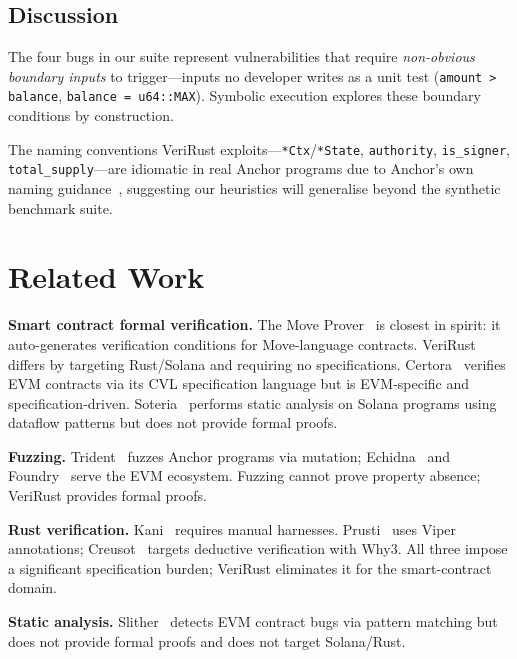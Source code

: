 \documentclass[sigconf,review,anonymous]{acmart}
\begin{document}
\subsection{Discussion}

The four bugs in our suite represent vulnerabilities that require
\emph{non-obvious boundary inputs} to trigger---inputs no developer
writes as a unit test (\texttt{amount > balance},
\texttt{balance = u64::MAX}).
Symbolic execution explores these boundary conditions by construction.

The naming conventions VeriRust exploits---\texttt{*Ctx}/\texttt{*State},
\texttt{authority}, \texttt{is\_signer}, \texttt{total\_supply}---are
idiomatic in real Anchor programs due to Anchor's own naming
guidance~\cite{anchor}, suggesting our heuristics will generalise
beyond the synthetic benchmark suite.

\section{Related Work}
\label{sec:related}

\noindent\textbf{Smart contract formal verification.}
The Move Prover~\cite{moveprover2022} is closest in spirit: it
auto-generates verification conditions for Move-language contracts.
VeriRust differs by targeting Rust/Solana and requiring no
specifications.
Certora~\cite{certora} verifies EVM contracts via its CVL
specification language but is EVM-specific and specification-driven.
Soteria~\cite{soteria2021} performs static analysis on Solana
programs using dataflow patterns but does not provide formal proofs.

\noindent\textbf{Fuzzing.}
Trident~\cite{trident} fuzzes Anchor programs via mutation;
Echidna~\cite{echidna2020} and Foundry~\cite{foundry} serve the EVM
ecosystem.
Fuzzing cannot prove property absence; VeriRust provides formal proofs.

\noindent\textbf{Rust verification.}
Kani~\cite{kani2022} requires manual harnesses.
Prusti~\cite{prusti2019} uses Viper annotations; Creusot~\cite{creusot2022}
targets deductive verification with Why3.
All three impose a significant specification burden; VeriRust
eliminates it for the smart-contract domain.

\noindent\textbf{Static analysis.}
Slither~\cite{slither2019} detects EVM contract bugs via pattern
matching but does not provide formal proofs and does not target
Solana/Rust.
\end{document}
